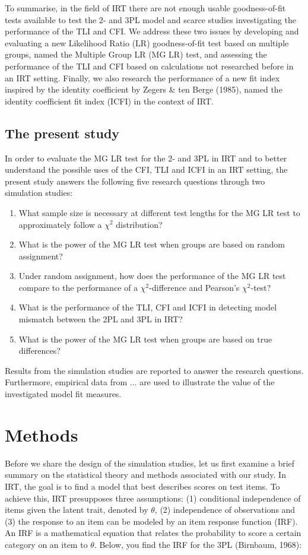 \documentclass[Royal,sageapa,times,doublespace]{sagej}
\begin{document}
\indent To summarise, in the field of IRT there are not enough usable goodness-of-fit tests available to test the 2- and 3PL model and scarce studies investigating the performance of the TLI and CFI. We address these two issues by developing and evaluating a new Likelihood Ratio (LR) goodness-of-fit test based on multiple groups, named the Multiple Group LR (MG LR) test, and assessing the performance of the TLI and CFI based on calculations not researched before in an IRT setting. Finally, we also research the performance of a new fit index inspired by the identity coefficient by Zegers \& ten Berge (1985), named the identity coefficient fit index (ICFI) in the context of IRT.

\subsection{The present study}
In order to evaluate the MG LR test for the 2- and 3PL in IRT and to better understand the possible uses of the CFI, TLI  and ICFI in an IRT setting, the present study answers the following five research questions through two simulation studies:
\begin{enumerate}
\item{What sample size is necessary at different test lengths for the MG LR test to approximately follow a $\chi^2$ distribution?}
\item{What is the power of the MG LR test when groups are based on random assignment?}
\item{Under random assignment, how does the performance of the MG LR test compare to the performance of a $\chi^2$-difference and Pearson's $\chi^2$-test?}
\item{What is the performance of the TLI, CFI and ICFI in detecting model mismatch between the 2PL and 3PL in IRT?}
\item{What is the power of the MG LR test when groups are based on true differences?}
\end{enumerate}

Results from the simulation studies are reported to answer the research questions. Furthermore, empirical data from ... are used to illustrate the value of the investigated model fit measures.

\section{Methods}
Before we share the design of the simulation studies, let us first examine a brief summary on the statistical theory and methods associated with our study. In IRT, the goal is to find a model that best describes scores on test items. To achieve this, IRT presupposes three assumptions: (1) conditional independence of items given the latent trait, denoted by $\theta$, (2) independence of observations and (3) the response to an item can be modeled by an item response function (IRF). An IRF is a mathematical equation that relates the probability to score a certain category on an item to $\theta$. Below, you find the IRF for the 3PL (Birnbaum, 1968):
\end{document}

